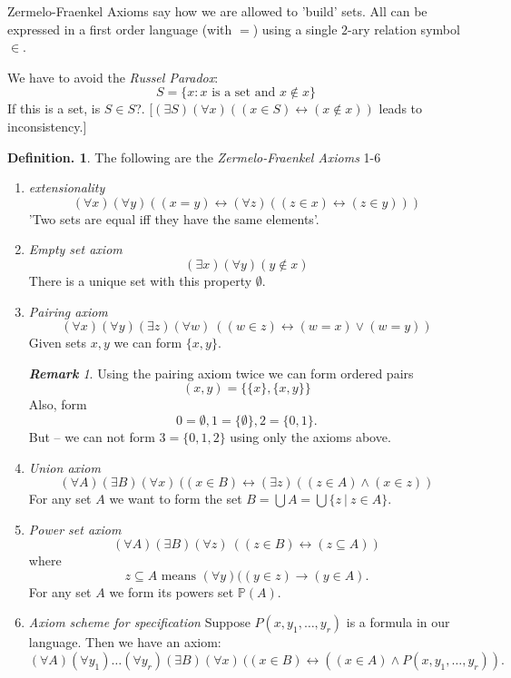 \documentclass[a4paper,oneside,11pt,DIV=12,parskip=half]{scrartcl}
\theoremstyle{plain}
\theoremstyle{definition}
\newtheorem{definition}[theorem]{Definition.}
\newtheorem{remark, definition}[theorem]{Remark and Definition.}
\newtheorem{lemma, definition}[theorem]{Lemma and Definition.}
\newtheorem{theorem, definition}[theorem]{Theorem and Definition.}
\theoremstyle{remark}
\newtheorem*{remark}{\textbf{Remark}}
\newtheorem*{remark, example}{\textbf{Remark and Exercise}}
\begin{document}
Zermelo-Fraenkel Axioms say how we are allowed to 'build' sets. All can be expressed in a first order language (with $=$) using a single $2$-ary relation symbol $\in$.

We have to avoid the \emph{Russel Paradox}: 
\[ S = \{ x : x \text{ is a set and } x \not \in x \} \]
If this is a set, is $S \in S$?.
[$(\exists S) (\forall x)((x \in S) \leftrightarrow (x \not \in x))$ leads to inconsistency.]

\begin{definition}
The following are the \emph{Zermelo-Fraenkel Axioms} 1-6
\begin{enumerate}
    \item \emph{extensionality}
        \[ (\forall x)(\forall y)((x=y)\leftrightarrow(\forall z)((z \in x) \leftrightarrow (z \in y))) \]
        'Two sets are equal iff they have the same elements'.
    \item \emph{Empty set axiom}
        \[ (\exists x)(\forall y)( y \not \in x) \]
        There is a unique set with this property $\emptyset$.
    \item \emph{Pairing axiom}\\
        \[ (\forall x)(\forall y)(\exists z)(\forall w) ~ (( w \in z) \leftrightarrow (w = x) \lor (w = y)) \]
        Given sets $x,y$ we can form $\{x,y\}$.
    \begin{remark}
    Using the pairing axiom twice we can form ordered pairs
        \[ (x,y) = \{ \{x \}, \{x,y\} \} \]
    Also, form
        \[ 0 = \emptyset , 1 = \{ \emptyset \}, 2 = \{0,1 \}.\]
    But --  we can not form $3 = \{0,1,2\}$ using only the axioms above.
    \end{remark}
    \item \emph{Union axiom}
        \[ (\forall A)(\exists B)(\forall x) ~ ((x \in B) \leftrightarrow (\exists z)((z \in A) \land (x \in z)) \]
    For any set $A$ we want to form the set $B = \bigcup A = \bigcup \{z ~|~ z \in A\} $.
    \item \emph{Power set axiom}
        \[ (\forall A)(\exists B)(\forall z) ~ ((z \in B) \leftrightarrow (z \subseteq A)) \]
    where
        \[ z \subseteq A \text{ means } (\forall y)((y \in z) \rightarrow (y \in A). \]
    For any set $A$ we form its powers set $\mathbb{P}(A)$.
    \item \emph{Axiom scheme for specification}
    Suppose $P(x,y_1,\dots,y_r)$ is a formula in our language. Then we have an axiom:
        \[ (\forall A)(\forall y_1) \dots (\forall y_r)(\exists B)(\forall x) ~ ((x \in B) \leftrightarrow ((x \in A) \land P(x,y_1,\dots, y_r)). \]

\end{enumerate}
\end{definition}
\end{document}
